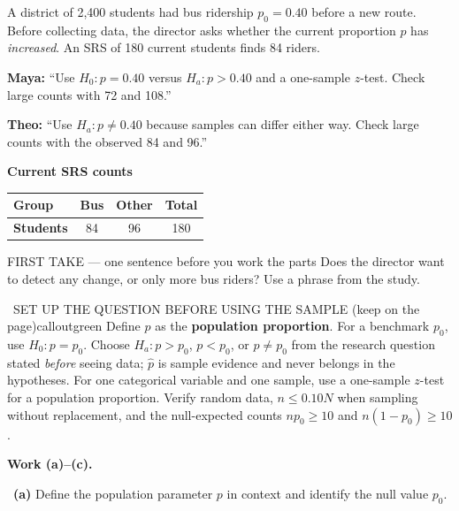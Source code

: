 \documentclass[11pt]{article}
\begin{document}


A district of 2{,}400 students had bus ridership $p_0=0.40$ before a new route. Before collecting data, the director asks whether the current proportion $p$ has \emph{increased}. An SRS of 180 current students finds 84 riders.\par\smallskip \textbf{Maya:} ``Use $H_0:p=0.40$ versus $H_a:p>0.40$ and a one-sample $z$-test. Check large counts with 72 and 108.''\par \textbf{Theo:} ``Use $H_a:p\neq0.40$ because samples can differ either way. Check large counts with the observed 84 and 96.''\par
\begin{center}
\textbf{Current SRS counts}\par\smallskip
\begin{tabular}{|l|c|c|c|}
\hline
\textbf{Group} & \textbf{Bus} & \textbf{Other} & \textbf{Total} \\ \hline
\textbf{Students} & 84 & 96 & 180 \\ \hline
\end{tabular}
\end{center}
\begin{firsttakebox}{FIRST TAKE --- one sentence before you work the parts}
Does the director want to detect any change, or only more bus riders? Use a phrase from the study.
\workspace{0.9in}
\end{firsttakebox}

\begin{callout}{\IconBook\ SET UP THE QUESTION BEFORE USING THE SAMPLE (keep on the page)}{calloutgreen}
Define $p$ as the \textbf{population proportion}. For a benchmark $p_0$, use $H_0:p=p_0$.
Choose $H_a:p>p_0$, $p<p_0$, or $p\neq p_0$ from the research question stated \emph{before} seeing data;
$\hat p$ is sample evidence and never belongs in the hypotheses. For one categorical variable and one sample,
use a one-sample $z$-test for a population proportion. Verify random data, $n\leq0.10N$ when sampling without
replacement, and the null-expected counts $np_0\geq10$ and $n(1-p_0)\geq10$.
\end{callout}

\newpage
\textbf{Work (a)--(c).}\par\smallskip

~\textbf{(a)} Define the population parameter $p$ in context and identify the null value $p_0$.\par
\workspace{0.7in}
\end{document}
